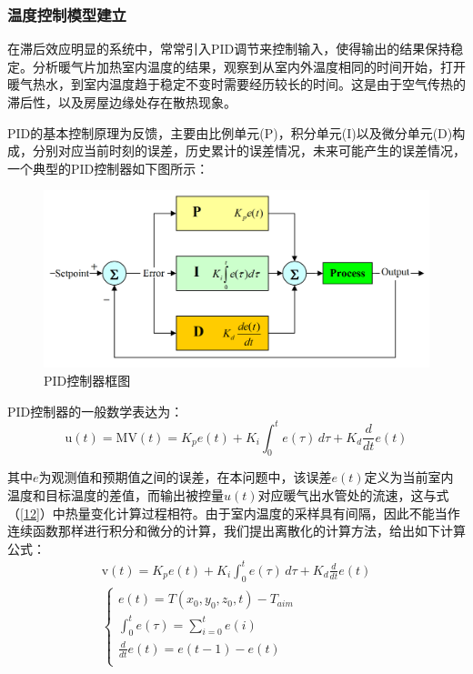 \documentclass{my_paper}
\begin{document}
\subsubsection{温度控制模型建立}
在滞后效应明显的系统中，常常引入PID调节来控制输入，使得输出的结果保持稳定\cite{5}。分析暖气片加热室内温度的结果，观察到从室内外温度相同的时间开始，打开暖气热水，到室内温度趋于稳定不变时需要经历较长的时间。这是由于空气传热的滞后性，以及房屋边缘处存在散热现象。

PID\cite{6}的基本控制原理为反馈，主要由比例单元(P)，积分单元(I)以及微分单元(D)构成，分别对应当前时刻的误差，历史累计的误差情况，未来可能产生的误差情况，一个典型的PID控制器如下图所示：

\begin {figure}[h]
\centering %
\includegraphics[width=\textwidth]{pid.png}
\caption{PID控制器框图\cite{6}} %
\label{five}
\end {figure}

PID控制器的一般数学表达为：
\begin{equation}
    {\mathrm  {u}}(t)={\mathrm  {MV}}(t)=K_{p}{e(t)}+K_{{i}}\int _{{0}}^{{t}}{e(\tau )}\,{d\tau }+K_{{d}}{\frac  {d}{dt}}e(t)
\label{}
\end{equation}

其中$e$为观测值和预期值之间的误差，在本问题中，该误差$e(t)$定义为当前室内温度和目标温度的差值，而输出被控量$u(t)$对应暖气出水管处的流速，这与式（\ref{12}）中热量变化计算过程相符。由于室内温度的采样具有间隔，因此不能当作连续函数那样进行积分和微分的计算，我们提出离散化的计算方法，给出如下计算公式：
\begin{equation}
    \begin{aligned}
        {\mathrm  {v}}(t)= K_{p}{e(t)}+K_{{i}}\int _{{0}}^{{t}}{e(\tau )}\,{d\tau }+K_{{d}}{\frac  {d}{dt}}e(t)\\
        \begin{cases}
            e(t) = T(x_0,y_0,z_0,t)-T_{aim}\\
            \int _{{0}}^{{t}}{e(\tau )} = \sum_{i=0}^{t} e(i)\\
            {\frac  {d}{dt}}e(t) = e(t-1)-e(t)\\
        \end{cases}
    \end{aligned}
\label{31}
\end{equation}
\end{document}

